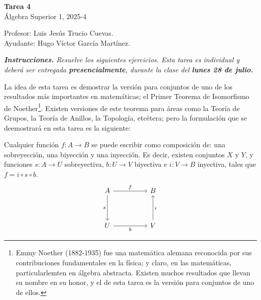\documentclass[letterpaper,DIV=14,headsepline,12pt]{scrartcl}
\begin{document}
    \begin{center}
        {\fontsize{30}{60}\rmfamily \textbf{Tarea 4}} \\ \vspace{.2cm} Álgebra
        Superior 1, 2025-4
    \end{center}
    \begin{flushright}
        \footnotesize \hfill Profesor: Luis Jesús Trucio Cuevas.\\
        \hfill Ayudante: Hugo Víctor García Martínez.
    \end{flushright}

    \noindent\textit{\textbf{Instrucciones.} Resuelve los siguientes ejercicios.
    Esta tarea es individual y deberá ser entregada \textbf{presencialmente},
    durante la clase del \textbf{lunes 28 de julio.} \vspace{.4cm}}

    La idea de esta tarea es demostrar la versión para conjuntos de uno de los
    resultados más importantes en matemáticas; el Primer Teorema de Isomorfismo
    de Noether\footnote{Emmy Noether (1882-1935) fue una matemática alemana
    reconocida por sus contribuciones fundamentales en la física; y claro, en
    las matemáticas, particularlemten en álgebra abstracta. Existen muchos
    resultados que llevan su nombre en su honor, y el de esta tarea es la
    versión para conjuntos de uno de ellos.}. Existen versiones de este teorema
    para áreas como la Teoría de Grupos, la Teoría de Anillos, la Topología,
    etcétera; pero la formulación que se deemostrará en esta tarea es la
    siguiente:

    \begin{teorema}\label{teo:primero}
        Cualquier función $f\colon A \to B$ se puede escribir como composición
        de: una sobreyección, una biyección y una inyección. Es decir, existen
        conjuntos $X$ y $Y$, y funciones $s\colon A \to U$ sobreyectiva, $b\colon U \to V$
        biyectiva e $i\colon V \to B$ inyectiva, tales que $f = i \circ s \circ b$.
        \begin{equation}\label{eq:obj}
            \begin{tikzcd}
            A && B \\
            \\
            U && V
            \arrow["f", from=1-1, to=1-3]
            \arrow["s"', from=1-1, to=3-1]
            \arrow["b"', from=3-1, to=3-3]
            \arrow["i"', from=3-3, to=1-3]
        \end{tikzcd}
        \end{equation}
    \end{teorema}
\end{document}
